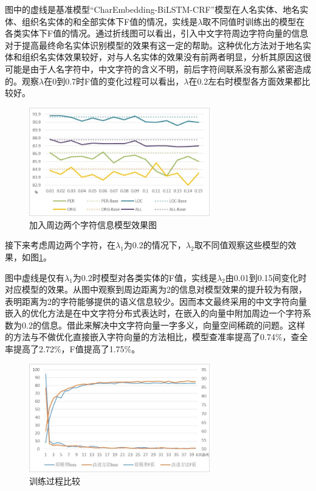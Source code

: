 \documentclass[winfonts,master,oneside,nobackinfo]{njuthesis}
\begin{document}
图中的虚线是基准模型“CharEmbedding-BiLSTM-CRF”模型在人名实体、地名实体、组织名实体的和全部实体下F值的情况，实线是$\lambda$取不同值时训练出的模型在各类实体下F值的情况。通过折线图可以看出，引入中文字符周边字符向量的信息对于提高最终命名实体识别模型的效果有这一定的帮助。这种优化方法对于地名实体和组织名实体效果较好，对与人名实体的效果没有前两者明显，分析其原因这很可能是由于人名字符中，中文字符的含义不明，前后字符间联系没有那么紧密造成的。观察$\lambda$在0到0.7时F值的变化过程可以看出，$\lambda$在0.2左右时模型各方面效果都比较好。


\begin{figure}[h]
\centering
\includegraphics[width=0.7\textwidth]{./figure/参数2.jpg}
\caption{加入周边两个字符信息模型效果图}
\label{k=2}
\end{figure}

接下来考虑周边两个字符，在$\lambda_{1}$为0.2的情况下，$\lambda_{2}$取不同值观察这些模型的效果，如图\ref{k=2}。


图中虚线是仅有$\lambda_{1}$为0.2时模型对各类实体的F值，实线是$\lambda_{2}$由0.01到0.15间变化时对应模型的效果。从图中观察到周边距离为2的信息对模型效果的提升较为有限，表明距离为2的字符能够提供的语义信息较少。因而本文最终采用的中文字符向量嵌入的优化方法是在中文字符分布式表达时，在嵌入的向量中附加周边一个字符系数为0.2的信息。借此来解决中文字符向量一字多义，向量空间稀疏的问题。这样的方法与不做优化直接嵌入字符向量的方法相比，模型查准率提高了0.74\%，查全率提高了2.72\%，F值提高了1.75\%。

\begin{figure}[h]
\centering
\includegraphics[width=0.7\textwidth]{./figure/训练过程.jpg}
\caption{训练过程比较}
\label{train_step}
\end{figure}
\end{document}
